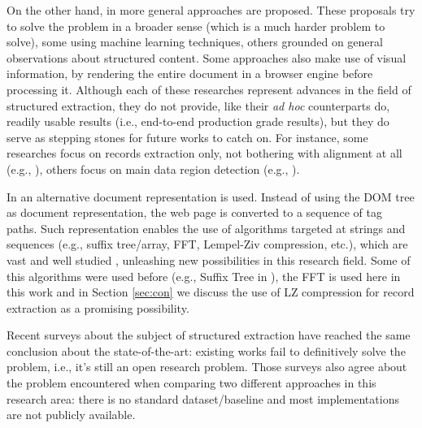 \documentclass{vldb}
\begin{document}
On the other hand, in \cite{RRunner01, exalg2003, vips03, viper05, MDR03,
depta05, NET05, TPC09, vide10, gstm2010, fivatech2010, cvts2012, SuffixTree12,
grigalis2013towards, datapath2015, autorm2015} more general approaches are proposed.
These proposals try to solve the problem in a broader sense (which is a much
harder problem to solve), some using machine learning
techniques\cite{RRunner01,fivatech2010,grigalis2013towards,datapath2015}, others
grounded on general observations about structured
content\cite{MDR03,exalg2003,NET05,depta05,TPC09,gstm2010,SuffixTree12,cvts2012,autorm2015}.
Some approaches also make use of visual information, by rendering the entire
document in a browser engine before processing
it\cite{vips03,viper05,depta05,vide10,grigalis2013towards}.
Although each of these researches represent advances in the field of structured
extraction, they do not provide, like their \textit{ad hoc} counterparts do,
readily usable results (i.e., end-to-end production grade results), but they do
serve as stepping stones for future works to catch on. For instance, some
researches focus on records extraction only, not bothering with alignment at all
(e.g., \cite{TPC09}), others focus on main data region detection (e.g.,
\cite{vips03}).

In \cite{TPC09, SuffixTree12, TPS2013} an alternative document representation is
used. Instead of using the DOM tree as document representation, the web page
is converted to a sequence of tag paths. Such representation enables the use of
algorithms targeted at strings and sequences (e.g., suffix
tree/array\cite{ukkonen1995, manber1993suffix}, FFT\cite{fft1965}, Lempel-Ziv
compression\cite{ziv1977universal}, etc.), which are vast and well studied
\cite{gusfield1997algorithms}, unleashing new possibilities in this research
field. Some of this algorithms were used before (e.g., Suffix Tree in
\cite{SuffixTree12}), the FFT is used here in this work and in Section
\ref{sec:con} we discuss the use of LZ compression for record extraction as a
promising possibility.

Recent surveys\cite{survey2013, survey2014} about the subject of structured
extraction have reached the same conclusion about the state-of-the-art: existing
works fail to definitively solve the problem, i.e., it's still an open research
problem. Those surveys also agree about the problem encountered when comparing
two different approaches in this research area: there is no standard
dataset/baseline and most implementations are not publicly available.
\end{document}
